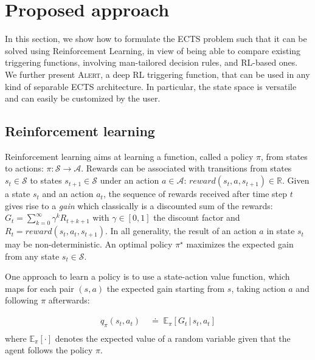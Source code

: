 \documentclass[sigconf, nonacm, table]{acmart}
\begin{document}
\section{Proposed approach}
\label{sec:proposed_approach}

In this section, we show how to formulate the ECTS problem such that it can be solved using Reinforcement Learning, in view of being able to compare existing triggering functions, involving man-tailored decision rules, and RL-based ones. 
We further present \textsc{Alert}, a deep RL triggering function, that can be used in any kind of separable ECTS architecture. In particular, the state space is versatile and can easily be customized by the user.

\subsection{Reinforcement learning}
\label{sec_RL_in_general}

Reinforcement learning \cite{sutton2018reinforcement} aims at learning a function, called a policy $\pi$, from states to actions: $\pi: {\mathcal{S}} \rightarrow {\mathcal{A}}$. Rewards can be associated with transitions from states $s_t \in {\mathcal{S}}$ to states $s_{t+1} \in {\mathcal{S}}$ under an action $a \in {\mathcal{A}}$: $reward(s_t, a, s_{t+1}) \in \mathbb{R}$. 
Given a state $s_t$ and an action $a_t$, the sequence of rewards received after time step $t$ gives rise to a \textit{gain} which classically is a discounted sum of the rewards: $G_t=\sum_{k=0}^\infty \gamma^k R_{t+k+1}$ with $\gamma \in [0, 1]$ the discount factor and $R_{t} = reward(s_t, a_t, s_{t+1})$.
In all generality, the result of an action $a$ in state $s_t$ may be non-deterministic. An optimal policy $\pi^\star$  maximizes the expected gain from any state $s_t \in {\mathcal{S}}$.  


One approach to learn a policy is to use a state-action value function, which maps for each pair $(s, a)$ the expected gain starting from $s$, taking action $a$ and following $\pi$ afterwards: 

\begin{equation}
    \begin{split}
    q_\pi(s_t, a_t) \; &\doteq \; \mathbb{E}_\pi[G_t \, | \, s_t, a_t] \\ 
    \end{split}
    \label{eq_rl_v_function}
\end{equation}
where $\mathbb{E}_\pi[\cdot]$ denotes the expected value of a random variable given that the agent follows the policy $\pi$.
\end{document}
